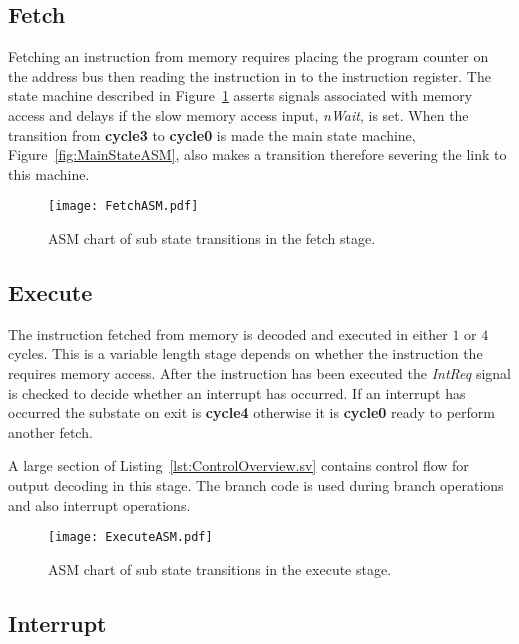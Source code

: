 \subsection{Fetch}

Fetching an instruction from memory requires placing the program counter on the address bus then reading the instruction in to the instruction register. 
The state machine described in Figure~\ref{fig:FetchASM} asserts signals associated with memory access and delays if the slow memory access input, \textit{nWait}, is set.
When the transition from \textbf{cycle3} to \textbf{cycle0} is made the main state machine, Figure~\ref{fig:MainStateASM}, also makes a transition therefore severing the link to this machine. 

\begin{figure}[ht]
   \centering
    \texttt{[image: FetchASM.pdf]}
		\caption{ASM chart of sub state transitions in the fetch stage.}
		\label{fig:FetchASM}
\end{figure}





\subsection{Execute}

The instruction fetched from memory is decoded and executed in either $1$ or $4$ cycles.
This is a variable length stage depends on whether the instruction the requires memory access.
After the instruction has been executed the \textit{IntReq} signal is checked to decide whether an interrupt has occurred.
If an interrupt has occurred the substate on exit is \textbf{cycle4} otherwise it is \textbf{cycle0} ready to perform another fetch. 

A large section of Listing~\ref{lst:ControlOverview.sv} contains control flow for output decoding in this stage.
The branch code is used during branch operations and also interrupt operations.
\begin{figure}[ht]
   \centering
    \texttt{[image: ExecuteASM.pdf]}
		\caption{ASM chart of sub state transitions in the execute stage.}
		\label{fig:ExecuteASM}
\end{figure}





\subsection{Interrupt}

